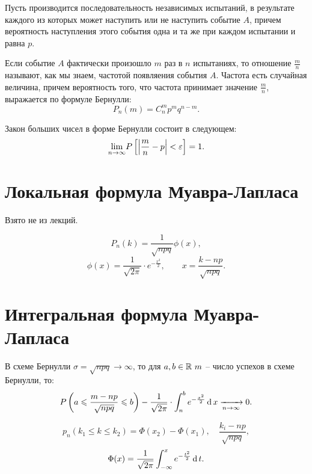 \begin{theorem}
	Пусть производится последовательность независимых испытаний, в результате каждого из которых может наступить или не наступить событие $A$, причем вероятность наступления этого события одна и та же при каждом испытании и равна $p$.

	Если событие $A$ фактически произошло $m$ раз в $n$ испытаниях, то отношение $\frac{m}{n} $ называют, как мы знаем, частотой появляения события $A$. Частота есть случайная величина, причем вероятность того, что частота принимает значение $\frac{m}{n} $, выражается по формуле Бернулли:
	\[
		P_n(m) = C_{n}^{m} p^m q^{n-m} .
	\]

	Закон больших чисел в форме Бернулли состоит в следующем:
	\[
		\underset{n \rightarrow \infty }{\lim} P \left[\left\lvert \frac{m}{n} - p\right\rvert < \varepsilon \right] = 1.
	\]
\end{theorem}

\section{Локальная формула Муавра-Лапласа}

\begin{note}
	Взято не из лекций.
\end{note}

\begin{theorem}
	\[
		P_n(k) = \frac{1}{\sqrt{npq} } \phi (x),
	\]
	\[
		\phi (x) = \frac{1}{\sqrt{2\pi} } \cdot e^{-\frac{x^2}{2} } , \qquad x = \frac{k - np}{\sqrt{npq} } .
	\]
\end{theorem}

\section{Интегральная формула Муавра-Лапласа}

\begin{theorem}
	В схеме Бернулли $\sigma = \sqrt{npq} \rightarrow \infty $, то для $a,b \in \mathbb{R} \ m$ -- число успехов в схеме Бернулли, то:
	\[
		P \left(a \leqslant \frac{m - np}{\sqrt{npq} } \leqslant b\right) - \frac{1}{\sqrt{2\pi} } \cdot \int_{n}^{b} e^{-\frac{x^2}{2} } \operatorname{d} x \xrightarrow[n \rightarrow \infty]{} 0.
	\]
\end{theorem}

\begin{note}
	\[
		p_n (k_1 \leqslant k \leqslant k_2) = \Phi (x_2) - \Phi (x_1), \quad \frac{k_i - np}{\sqrt{npq} } ,
	\]
	\[
		\Phi (x) = \frac{1}{\sqrt{2\pi} } \int_{-\infty }^{x} e^{-\frac{t^2}{2} } \operatorname{d} t.
	\]
\end{note}
